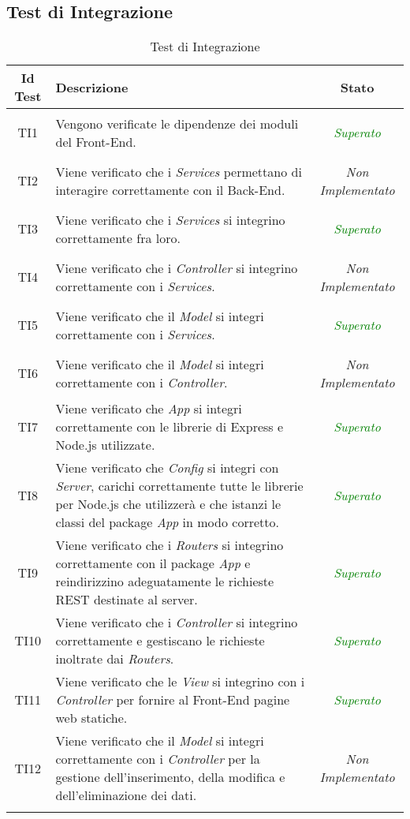 \subsection{Test di Integrazione}

\normalsize
\begin{longtable}{|c|>{}m{8cm}|c|}
\hline 
\textbf{Id Test} & \textbf{Descrizione} & \textbf{Stato}\\
\hline
\endhead
\hypertarget{TI1}{TI1} & Vengono verificate le dipendenze dei moduli del Front-End. & \textcolor{Green}{\textit{Superato}}\\ \hline
\hypertarget{TI2}{TI2} & Viene verificato che i \textit{Services} permettano di interagire correttamente con il Back-End. & \textit{Non Implementato}\\ \hline
\hypertarget{TI3}{TI3} & Viene verificato che i \textit{Services} si integrino correttamente fra loro. & \textcolor{Green}{\textit{Superato}}\\ \hline
\hypertarget{TI4}{TI4} & Viene verificato che i \textit{Controller} si integrino correttamente con i \textit{Services}. & \textit{Non Implementato}\\ \hline
\hypertarget{TI5}{TI5} & Viene verificato che il \textit{Model} si integri correttamente con i \textit{Services}. & \textcolor{Green}{\textit{Superato}}\\ \hline
\hypertarget{TI6}{TI6} & Viene verificato che il \textit{Model} si integri correttamente con i \textit{Controller}. & \textit{Non Implementato}\\ \hline
\hypertarget{TI7}{TI7} & Viene verificato che \textit{App} si integri correttamente con le librerie di Express e Node.js utilizzate. & \textcolor{Green}{\textit{Superato}}\\ \hline
\hypertarget{TI8}{TI8} & Viene verificato che \textit{Config} si integri con \textit{Server}, carichi correttamente tutte le librerie per Node.js che utilizzerà e che istanzi le classi del package \textit{App} in modo corretto. & \textcolor{Green}{\textit{Superato}}\\ \hline
\hypertarget{TI9}{TI9} & Viene verificato che i \textit{Routers} si integrino correttamente con il package \textit{App} e reindirizzino adeguatamente le richieste REST destinate al server. & \textcolor{Green}{\textit{Superato}}\\ \hline
\hypertarget{TI10}{TI10} & Viene verificato che i \textit{Controller} si integrino correttamente e gestiscano le richieste inoltrate dai \textit{Routers}. & \textcolor{Green}{\textit{Superato}}\\ \hline
\hypertarget{TI11}{TI11} & Viene verificato che le \textit{View} si integrino con i \textit{Controller} per fornire al Front-End pagine web statiche. & \textcolor{Green}{\textit{Superato}}\\ \hline
\hypertarget{TI12}{TI12} & Viene verificato che il \textit{Model} si integri correttamente con i \textit{Controller} per la gestione dell'inserimento, della modifica e dell'eliminazione dei dati. & \textit{Non Implementato}\\ \hline
\caption[Test di Integrazione]{Test di Integrazione}
\label{tabella:test2}
\end{longtable}
\clearpage

